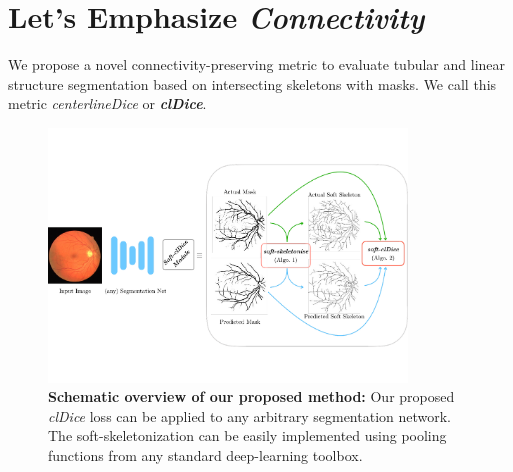 \section{Let's Emphasize \emph{Connectivity}}
We propose a novel connectivity-preserving metric to evaluate tubular and linear structure segmentation based on intersecting skeletons with masks. We call this metric \textit{centerlineDice} or \textbf{\textit{clDice}}.
\begin{figure}[]
\begin{center}
\includegraphics[width=0.85\textwidth]{figs/overview.pdf}
\end{center}
\label{met}
\caption{ \textbf{Schematic overview of our proposed method:} Our proposed \textit{clDice} loss can be applied to any arbitrary segmentation network. The soft-skeletonization can be easily implemented using pooling functions from any standard deep-learning toolbox.}
\vspace{-1em}
\end{figure}

